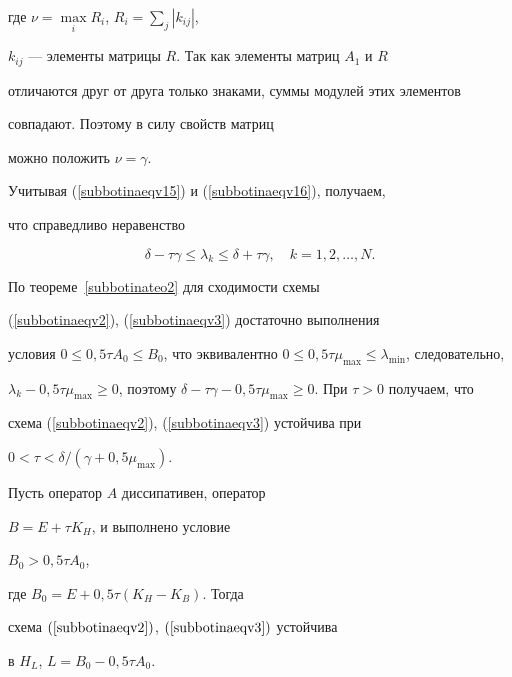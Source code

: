 где $\nu =\max\limits_i R_i$, $R_i =\sum\limits_j {| {k_{ij} }|}$,


$k_{ij}$ --- элементы матрицы $R$. Так как элементы матриц $A_1$ и $R$ 


отличаются друг от друга только знаками, суммы модулей этих элементов 


совпадают. Поэтому в силу свойств матриц~\cite{subbotinabib9}


можно положить $\nu =\gamma$.


Учитывая (\ref{subbotinaeqv15}) и (\ref{subbotinaeqv16}), получаем, 


что справедливо неравенство


$$


\delta -\tau \gamma \le \lambda_k \le \delta +\tau \gamma,


\quad k=1,2,\dotsc,N.


$$





По теореме~\ref{subbotinateo2} для сходимости схемы


(\ref{subbotinaeqv2}), (\ref{subbotinaeqv3}) достаточно выполнения


условия $0 \le 0{,}5\tau A_0 \le B_0$, что эквивалентно $0 \le


0{,}5\tau \mu_{\max} \le \lambda_{\min}$, следовательно,


$\lambda_k-0{,}5\tau \mu_{\max} \ge 0$, поэтому $\delta - \tau


\gamma -0{,}5\tau \mu_{\max} \ge 0$. При $\tau >0$ получаем, что


схема (\ref{subbotinaeqv2}), (\ref{subbotinaeqv3}) устойчива при


$0<\tau <\delta/\left({\gamma +0{,}5\mu_{\max}}


\right)$.





\begin{thm}


\label{subbotinateo3}


Пусть оператор $A$ диссипативен, оператор


$B=E+\tau K_H$, и выполнено условие


$B_0 > 0{,}5 \tau A_0$,


где $B_0=E+0{,}5\tau \left({K_H - K_B} \right)$. Тогда 


схема $(\ref{subbotinaeqv2})$, $(\ref{subbotinaeqv3})$ устойчива 


в $H_L$, $L=B_0 - 0{,}5\tau A_0$.


\end{thm}








